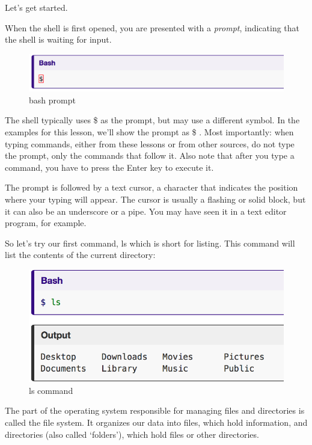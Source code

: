 \documentclass[11pt]{book}
\begin{document}
Let’s get started.

When the shell is first opened, you are presented with a \emph{prompt}, indicating that the shell is waiting for input.

\begin{figure}
\includegraphics[scale=.6]{figures/bash.png}
\caption{bash prompt}
\end{figure}

The shell typically uses \$ as the prompt, but may use a different symbol. In the examples for this lesson, we’ll show the prompt as \$ . Most importantly: when typing commands, either from these lessons or from other sources, do not type the prompt, only the commands that follow it. Also note that after you type a command, you have to press the Enter key to execute it.

The prompt is followed by a text cursor, a character that indicates the position where your typing will appear. The cursor is usually a flashing or solid block, but it can also be an underscore or a pipe. You may have seen it in a text editor program, for example.

So let’s try our first command, ls which is short for listing. This command will list the contents of the current directory:

\begin{figure}[!]
\includegraphics[scale=.6]{figures/ls.png}
\caption{ls command}
\end{figure}



The part of the operating system responsible for managing files and directories is called the file system. It organizes our data into files, which hold information, and directories (also called ‘folders’), which hold files or other directories.
\end{document}
